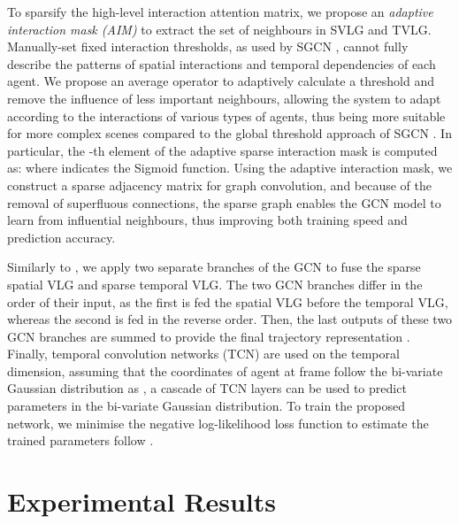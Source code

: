 \documentclass{article}
\begin{document}
To sparsify the high-level interaction attention matrix, we propose an \emph{adaptive interaction mask (AIM)} to extract the set of neighbours in SVLG and TVLG.
Manually-set fixed interaction thresholds, as used by SGCN \cite{shi2021sgcn}, cannot fully describe the patterns of spatial interactions and temporal dependencies of each agent. 
We propose an average operator to adaptively calculate a threshold and remove the influence of less important neighbours, allowing the system to adapt according to the interactions of various types of agents, thus being more suitable for more complex scenes compared to the global threshold approach of SGCN \cite{shi2021sgcn}.
In particular, the -th element of the adaptive sparse interaction mask  is computed as: 
 where  indicates the Sigmoid function. Using the adaptive interaction mask, we construct a sparse adjacency matrix for graph convolution, and because of the removal of superfluous connections, the sparse graph enables the GCN model to learn from influential neighbours, thus improving both training speed and prediction accuracy.















Similarly to \cite{shi2021sgcn}, we apply two separate branches of the GCN \cite{kipf2016gcn} to fuse the sparse spatial VLG and sparse temporal VLG. The two GCN branches differ in the order of their input, as the first is fed the spatial VLG before the temporal VLG, whereas the second is fed in the reverse order. Then, the last outputs of these two GCN branches are summed to provide the final trajectory representation .
Finally, temporal convolution networks (TCN) \cite{bai2018tcn} are used on the temporal dimension, assuming that the coordinates  of agent  at frame  follow the bi-variate Gaussian distribution as , a cascade of TCN layers can be used to predict parameters in the bi-variate Gaussian distribution. To train the proposed network, we minimise the negative log-likelihood loss function to estimate the trained parameters follow \cite{Mohamed2020socialstgcnn}. 




\section{Experimental Results}
\label{sec:results}
\end{document}
